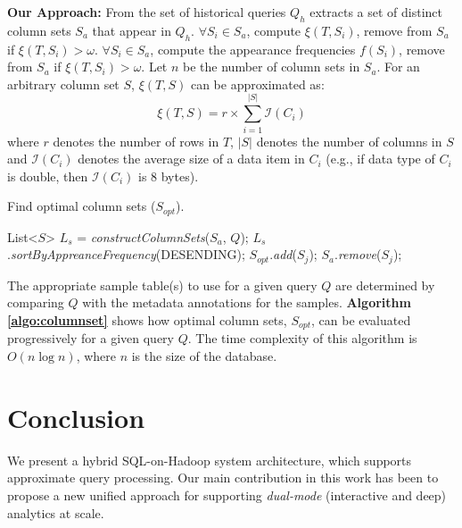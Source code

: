\documentclass{sig-alternate-05-2015}
\begin{document}
\noindent
\textbf{Our Approach:}
From the set of historical queries $Q_h$ extracts a set of distinct column sets $S_{a}$ that appear in $Q_h$.
$\forall S_i \in S_{a}$, compute $\xi(T, S_i)$, remove from $S_{a}$ if $\xi(T, S_i) > \omega$.
$\forall S_i \in S_{a}$, compute the appearance frequencies $f(S_i)$, remove from $S_{a}$ if $\xi(T, S_i) > \omega$.
Let $n$ be the number of column sets in $S_a$.
For an arbitrary column set $S$, $\xi(T, S)$ can be approximated as:
\begin{equation}
\xi(T, S) = r \times \sum_{i=1}^{|S|} \mathcal{I}(C_i)
\end{equation}
where $r$ denotes the number of rows in $T$, 
$|S|$ denotes the number of columns in $S$ 
and $\mathcal{I}(C_i)$ denotes the average size of a data item in $C_i$ 
(e.g., if data type of $C_i$ is double, then $\mathcal{I}(C_i)$ is 8 bytes).
\begin{algorithm}
\caption{Find optimal column sets ($S_{opt}$).}
\label{algo:columnset}
\begin{algorithmic}[1]
	\State List<$S$> $L_{s}$ = \textit{constructColumnSets}($S_a$, $Q$);
	\State $L_{s}$.\textit{sortByAppreanceFrequency}(DESENDING);
	\Return
	\Else 	
	\State $S_{opt}$.\textit{add}($S_j$); 
	\State $S_a$.\textit{remove}($S_j$); 
	\EndIf
	\EndFor
	\EndProcedure
\end{algorithmic}
\end{algorithm}

The appropriate sample table(s) to use for a given query $Q$ are determined by comparing $Q$ with the metadata annotations for the samples.  \textbf{Algorithm \ref{algo:columnset}} shows how optimal column sets, $S_{opt}$, can be evaluated progressively for a given query $Q$. The time complexity of this algorithm is $O (n \log n)$, where $n$ is the size of the database.


\section{Conclusion}
We present a hybrid SQL-on-Hadoop system architecture, which supports approximate query processing. 
Our main contribution in this work has been to propose a new unified approach for supporting \textit{dual-mode} (interactive and deep) analytics at scale.
\end{document}
